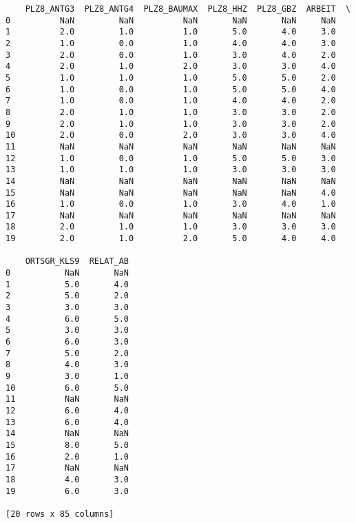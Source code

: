\documentclass[11pt]{article}
\begin{document}
\begin{verbatim}
    PLZ8_ANTG3  PLZ8_ANTG4  PLZ8_BAUMAX  PLZ8_HHZ  PLZ8_GBZ  ARBEIT  \
0          NaN         NaN          NaN       NaN       NaN     NaN   
1          2.0         1.0          1.0       5.0       4.0     3.0   
2          1.0         0.0          1.0       4.0       4.0     3.0   
3          2.0         0.0          1.0       3.0       4.0     2.0   
4          2.0         1.0          2.0       3.0       3.0     4.0   
5          1.0         1.0          1.0       5.0       5.0     2.0   
6          1.0         0.0          1.0       5.0       5.0     4.0   
7          1.0         0.0          1.0       4.0       4.0     2.0   
8          2.0         1.0          1.0       3.0       3.0     2.0   
9          2.0         1.0          1.0       3.0       3.0     2.0   
10         2.0         0.0          2.0       3.0       3.0     4.0   
11         NaN         NaN          NaN       NaN       NaN     NaN   
12         1.0         0.0          1.0       5.0       5.0     3.0   
13         1.0         1.0          1.0       3.0       3.0     3.0   
14         NaN         NaN          NaN       NaN       NaN     NaN   
15         NaN         NaN          NaN       NaN       NaN     4.0   
16         1.0         0.0          1.0       3.0       4.0     1.0   
17         NaN         NaN          NaN       NaN       NaN     NaN   
18         2.0         1.0          1.0       3.0       3.0     3.0   
19         2.0         1.0          2.0       5.0       4.0     4.0   

    ORTSGR_KLS9  RELAT_AB  
0           NaN       NaN  
1           5.0       4.0  
2           5.0       2.0  
3           3.0       3.0  
4           6.0       5.0  
5           3.0       3.0  
6           6.0       3.0  
7           5.0       2.0  
8           4.0       3.0  
9           3.0       1.0  
10          6.0       5.0  
11          NaN       NaN  
12          6.0       4.0  
13          6.0       4.0  
14          NaN       NaN  
15          8.0       5.0  
16          2.0       1.0  
17          NaN       NaN  
18          4.0       3.0  
19          6.0       3.0  

[20 rows x 85 columns]
    \end{verbatim}

    
    
\end{document}
